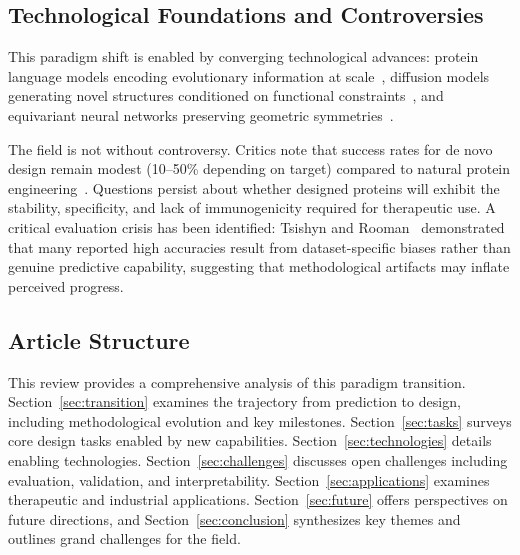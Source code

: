 \subsection*{Technological Foundations and Controversies}

This paradigm shift is enabled by converging technological advances: protein language models encoding evolutionary information at scale~\cite{rives2021esm1b,lin2023esm2}, diffusion models generating novel structures conditioned on functional constraints~\cite{watson2023rfdiffusion,ingraham2023chroma}, and equivariant neural networks preserving geometric symmetries~\cite{jing2021gvp,fuchs2020se3transformer}.

The field is not without controversy. Critics note that success rates for de novo design remain modest (10--50\% depending on target) compared to natural protein engineering~\cite{bernett2024bias}. Questions persist about whether designed proteins will exhibit the stability, specificity, and lack of immunogenicity required for therapeutic use. A critical evaluation crisis has been identified: Tsishyn and Rooman~\cite{bernett2024bias} demonstrated that many reported high accuracies result from dataset-specific biases rather than genuine predictive capability, suggesting that methodological artifacts may inflate perceived progress.

\subsection*{Article Structure}

This review provides a comprehensive analysis of this paradigm transition. Section~\ref{sec:transition} examines the trajectory from prediction to design, including methodological evolution and key milestones. Section~\ref{sec:tasks} surveys core design tasks enabled by new capabilities. Section~\ref{sec:technologies} details enabling technologies. Section~\ref{sec:challenges} discusses open challenges including evaluation, validation, and interpretability. Section~\ref{sec:applications} examines therapeutic and industrial applications. Section~\ref{sec:future} offers perspectives on future directions, and Section~\ref{sec:conclusion} synthesizes key themes and outlines grand challenges for the field.

